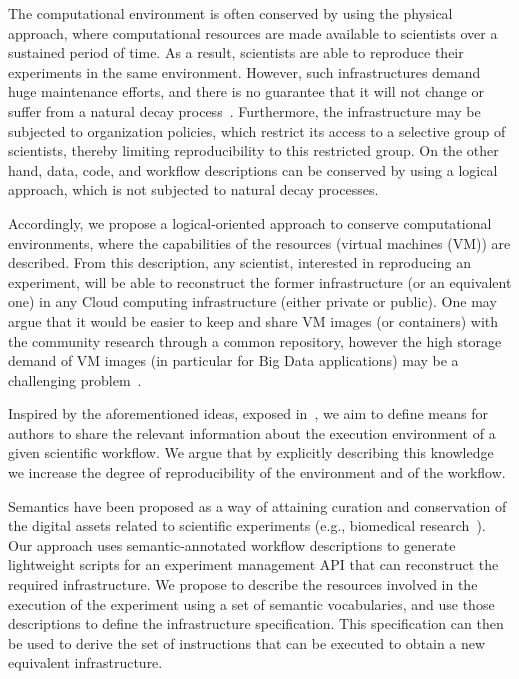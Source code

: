 The computational environment is often conserved by using the physical approach, where 
computational resources are made available to scientists over a sustained period of time. 
As a result, scientists are able to reproduce their experiments in the same environment. 
However, such infrastructures demand huge maintenance efforts, and there is no guarantee 
that it will not change or suffer from a natural decay process~\cite{Gavish2011637}. 
Furthermore, the infrastructure may be subjected to organization policies, which restrict 
its access to a selective group of scientists, thereby limiting reproducibility to this restricted 
group. On the other hand, data, code, and workflow descriptions can be conserved by using 
a logical approach, which is not subjected to natural decay processes.

Accordingly, we propose a logical-oriented approach to conserve computational environments, 
where the capabilities of the resources (virtual machines (VM)) are described. From this 
description, any scientist, interested in reproducing an experiment, will be able to reconstruct 
the former infrastructure (or an equivalent one) in any Cloud computing infrastructure (either 
private or public). One may argue that it would be easier to keep and share VM images (or
containers) with the community research through a common repository, however the high storage 
demand of VM images (in particular for Big Data applications) may be a challenging 
problem~\cite{Mao:2014:ROD:2600090.2512348,6552826}. 


Inspired by the aforementioned ideas, exposed in~\cite{King1995}, we aim to  define means 
for authors to share the relevant information about the execution environment of a given scientific
workflow. We argue that by explicitly describing this knowledge we increase the degree of 
reproducibility of the environment and of the workflow.

Semantics have been proposed as a way of attaining curation and conservation of the digital 
assets related to scientific experiments (e.g., biomedical research~\cite{MaloneSWO2014}). 
Our approach uses semantic-annotated workflow descriptions to generate lightweight scripts 
for an experiment management API that can reconstruct the required infrastructure. We 
propose to describe the resources involved in the execution of the experiment using a set of 
semantic vocabularies, and use those descriptions to define the infrastructure specification. 
This specification can then be used to derive the set of instructions that can be executed to 
obtain a new equivalent infrastructure. 

